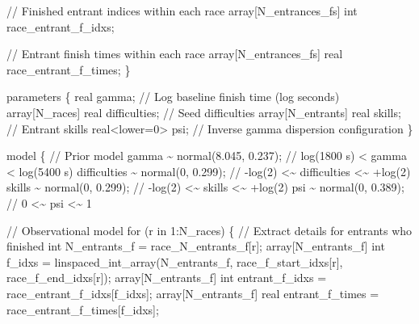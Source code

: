\documentclass[
  letterpaper,
  DIV=11,
  numbers=noendperiod]{scrartcl}
\newenvironment{Shaded}{\begin{snugshade}}{\end{snugshade}}
\newcommand{\CommentTok}[1]{\textcolor[rgb]{0.37,0.37,0.37}{#1}}
\newcommand{\ControlFlowTok}[1]{\textcolor[rgb]{0.00,0.23,0.31}{#1}}
\newcommand{\DataTypeTok}[1]{\textcolor[rgb]{0.68,0.00,0.00}{#1}}
\newcommand{\DecValTok}[1]{\textcolor[rgb]{0.68,0.00,0.00}{#1}}
\newcommand{\FloatTok}[1]{\textcolor[rgb]{0.68,0.00,0.00}{#1}}
\newcommand{\KeywordTok}[1]{\textcolor[rgb]{0.00,0.23,0.31}{#1}}
\newcommand{\NormalTok}[1]{\textcolor[rgb]{0.00,0.23,0.31}{#1}}
\begin{document}
\begin{codelisting}
\begin{Shaded}
\begin{Highlighting}[]
  \CommentTok{// Finished entrant indices within each race}
  \DataTypeTok{array}\NormalTok{[N\_entrances\_fs] }\DataTypeTok{int}\NormalTok{ race\_entrant\_f\_idxs;}

  \CommentTok{// Entrant finish times within each race}
  \DataTypeTok{array}\NormalTok{[N\_entrances\_fs] }\DataTypeTok{real}\NormalTok{ race\_entrant\_f\_times;}
\NormalTok{\}}

\KeywordTok{parameters}\NormalTok{ \{}
  \DataTypeTok{real}\NormalTok{ gamma;                       }\CommentTok{// Log baseline finish time (log seconds)}
  \DataTypeTok{array}\NormalTok{[N\_races] }\DataTypeTok{real}\NormalTok{ difficulties; }\CommentTok{// Seed difficulties}
  \DataTypeTok{array}\NormalTok{[N\_entrants] }\DataTypeTok{real}\NormalTok{ skills;    }\CommentTok{// Entrant skills}
  \DataTypeTok{real}\NormalTok{\textless{}}\KeywordTok{lower}\NormalTok{=}\DecValTok{0}\NormalTok{\textgreater{} psi;                }\CommentTok{// Inverse gamma dispersion configuration}
\NormalTok{\}}

\KeywordTok{model}\NormalTok{ \{}
  \CommentTok{// Prior model}
\NormalTok{  gamma \textasciitilde{} normal(}\FloatTok{8.045}\NormalTok{, }\FloatTok{0.237}\NormalTok{);    }\CommentTok{// log(1800 s) \textless{} gamma \textless{} log(5400 s)}
\NormalTok{  difficulties \textasciitilde{} normal(}\DecValTok{0}\NormalTok{, }\FloatTok{0.299}\NormalTok{); }\CommentTok{// {-}log(2) \textless{}\textasciitilde{} difficulties \textless{}\textasciitilde{} +log(2)}
\NormalTok{  skills \textasciitilde{} normal(}\DecValTok{0}\NormalTok{, }\FloatTok{0.299}\NormalTok{);       }\CommentTok{// {-}log(2) \textless{}\textasciitilde{}    skills    \textless{}\textasciitilde{} +log(2)}
\NormalTok{  psi \textasciitilde{} normal(}\DecValTok{0}\NormalTok{, }\FloatTok{0.389}\NormalTok{);          }\CommentTok{// 0 \textless{}\textasciitilde{} psi \textless{}\textasciitilde{} 1}

  \CommentTok{// Observational model}
  \ControlFlowTok{for}\NormalTok{ (r }\ControlFlowTok{in} \DecValTok{1}\NormalTok{:N\_races) \{}
    \CommentTok{// Extract details for entrants who finished}
    \DataTypeTok{int}\NormalTok{ N\_entrants\_f = race\_N\_entrants\_f[r];}
    \DataTypeTok{array}\NormalTok{[N\_entrants\_f] }\DataTypeTok{int}\NormalTok{ f\_idxs = linspaced\_int\_array(N\_entrants\_f,}
\NormalTok{                                                         race\_f\_start\_idxs[r],}
\NormalTok{                                                         race\_f\_end\_idxs[r]);}
    \DataTypeTok{array}\NormalTok{[N\_entrants\_f] }\DataTypeTok{int}\NormalTok{ entrant\_f\_idxs = race\_entrant\_f\_idxs[f\_idxs];}
    \DataTypeTok{array}\NormalTok{[N\_entrants\_f] }\DataTypeTok{real}\NormalTok{ entrant\_f\_times = race\_entrant\_f\_times[f\_idxs];}


\end{Highlighting}
\end{Shaded}
\end{codelisting}
\end{document}

